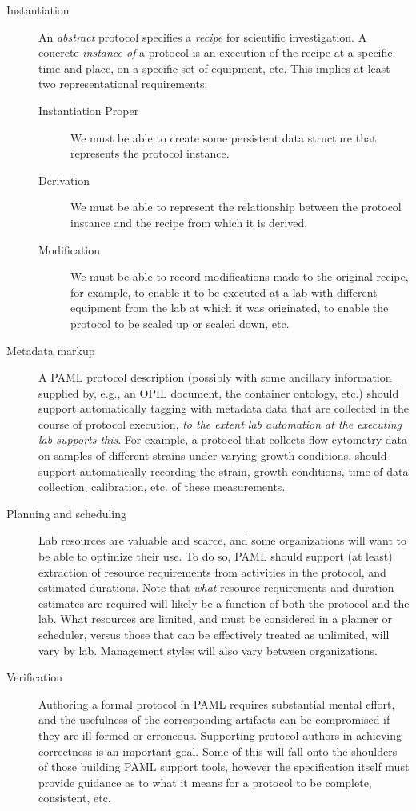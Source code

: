 \begin{description}
\item[Instantiation] An \emph{abstract} protocol specifies a \emph{recipe} for scientific investigation.  A concrete \emph{instance of} a protocol is an execution of the recipe at a specific time and place, on a specific set of equipment, etc.  This implies at least two representational requirements:
  \begin{description}
  \item[Instantiation Proper] We must be able to create some persistent data structure that represents the protocol instance.
  \item[Derivation] We must be able to represent the relationship between the protocol instance and the recipe from which it is derived.
  \item[Modification] We must be able to record modifications made to the original recipe, for example, to enable it to be executed at a lab with different equipment from the lab at which it was originated, to enable the protocol to be scaled up or scaled down, etc.
  \end{description}
\item[Metadata markup] A PAML protocol description (possibly with some ancillary information supplied by, e.g., an OPIL document, the container ontology, etc.) should support automatically tagging with metadata data that are collected in the course of protocol execution, \emph{to the extent lab automation at the executing lab supports this}.  For example, a protocol that collects flow cytometry data on samples of different strains under varying growth conditions, should support automatically recording the strain, growth conditions, time of data collection, calibration, etc. of these measurements.
\item[Planning and scheduling] Lab resources are valuable and scarce, and some organizations will want to be able to optimize their use. To do so, PAML should support (at least) extraction of resource requirements from activities in the protocol, and estimated durations.  Note that \emph{what} resource requirements and duration estimates are required will likely be a function of both the protocol and the lab.  What resources are limited, and must be considered in a planner or scheduler, versus those that can be effectively treated as unlimited, will vary by lab.  Management styles will also vary between organizations.
\item[Verification] Authoring a formal protocol in PAML requires substantial mental effort, and the usefulness of the corresponding artifacts can be compromised if they are ill-formed or erroneous.  Supporting protocol authors in achieving correctness is an important goal. Some of this will fall onto the shoulders of those building PAML support tools, however the specification itself must provide guidance as to what it means for a protocol to be complete, consistent, etc.

\end{description}

